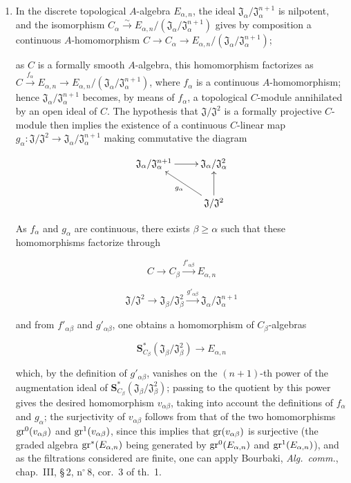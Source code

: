 \begin{env}[19.5.6.4]
\label{0.19.5.6.4}
\begin{enumerate}
  \item[\rm(i)] In the discrete topological $A$-algebra $E_{\alpha,n}$, the ideal $\mathfrak{J}_\alpha/\mathfrak{J}_\alpha^{n+1}$ is nilpotent, and the isomorphism $C_\alpha\xrightarrow{\sim}E_{\alpha,n}/(\mathfrak{J}_\alpha/\mathfrak{J}_\alpha^{n+1})$ gives by composition a continuous $A$-homomorphism $C\to C_\alpha\to E_{\alpha,n}/(\mathfrak{J}_\alpha/\mathfrak{J}_\alpha^{n+1})$;


  as $C$ is a formally smooth $A$-algebra, this homomorphism factorizes as $C\xrightarrow{f_\alpha}E_{\alpha,n}\to E_{\alpha,n}/(\mathfrak{J}_\alpha/\mathfrak{J}_\alpha^{n+1})$,
  where $f_\alpha$ is a continuous $A$-homomorphism;
  hence $\mathfrak{J}_\alpha/\mathfrak{J}_\alpha^{n+1}$ becomes, by means of $f_\alpha$, a topological $C$-module annihilated by an open ideal of $C$.
  The hypothesis that $\mathfrak{J}/\mathfrak{J}^2$ is a formally projective $C$-module then implies the existence of a continuous $C$-linear map $g_\alpha:\mathfrak{J}/\mathfrak{J}^2\to\mathfrak{J}_\alpha/\mathfrak{J}_\alpha^{n+1}$ making commutative the diagram
  
\[
\xymatrix{
      \mathfrak{J}_\alpha/\mathfrak{J}_\alpha^{n+1} \ar[r] & \mathfrak{J}_\alpha/\mathfrak{J}_\alpha^2 \\
      & \mathfrak{J}/\mathfrak{J}^2 \ar[ul]^{g_\alpha} \ar[u]
    }
\]


  As $f_\alpha$ and $g_\alpha$ are continuous, there exists $\beta\geq\alpha$ such that these homomorphisms factorize through
  
\[
C\to C_\beta\xrightarrow{f'_{\alpha\beta}}E_{\alpha,n}
\]

  
\[
\mathfrak{J}/\mathfrak{J}^2\to\mathfrak{J}_\beta/\mathfrak{J}_\beta^2\xrightarrow{g'_{\alpha\beta}}\mathfrak{J}_\alpha/\mathfrak{J}_\alpha^{n+1}
\]

  and from $f'_{\alpha\beta}$ and $g'_{\alpha\beta}$, one obtains a homomorphism of $C_\beta$-algebras
  
\[
\mathbf{S}_{C_\beta}^*(\mathfrak{J}_\beta/\mathfrak{J}_\beta^2) \to E_{\alpha,n}
\]

  which, by the definition of $g'_{\alpha\beta}$, vanishes on the $(n+1)$-th power of the augmentation ideal of $\mathbf{S}_{C_\beta}^*(\mathfrak{J}_\beta/\mathfrak{J}_\beta^2)$; passing to the quotient by this power gives the desired homomorphism $v_{\alpha\beta}$, taking into account the definitions of $f_\alpha$ and $g_\alpha$;
  the surjectivity of $v_{\alpha\beta}$ follows from that of the two homomorphisms $\operatorname{gr}^0(v_{\alpha\beta})$ and $\operatorname{gr}^1(v_{\alpha\beta})$,
  since this implies that $\operatorname{gr}(v_{\alpha\beta})$ is surjective (the graded algebra $\operatorname{gr}^*(E_{\alpha,n})$ being generated by $\operatorname{gr}^0(E_{\alpha,n})$ and $\operatorname{gr}^1(E_{\alpha,n})$), and
  as the filtrations considered are finite, one can apply Bourbaki, \emph{Alg.\ comm.}, chap.~III, \S\,2, n$^\circ$\,8, cor.~3 of th.~1.


\end{enumerate}
\end{env}
